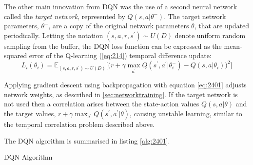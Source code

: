 The other main innovation from DQN was the use of a second neural network called the \textit{target network}, represented by $Q(s,a | \theta^-)$. The target network parameters, $\theta^-$, are a copy of the original network parameters $\theta$, that are updated periodically. Letting the notation $(s,a,r,s^\prime) \sim U(D)$ denote uniform random sampling from the buffer, the DQN loss function can be expressed as the mean-squared error of the Q-learning (\ref{eq:214}) temporal difference update:
\begin{equation}
	L_i(\theta_i) = \mathbb{E}_{(s,a,r,s^\prime) \sim U(D)} \bigg[ \bigg( r + \gamma \max_{a^\prime} Q(s^\prime, a^\prime | \theta_i^-) - Q(s, a | \theta_i) \bigg)^2 \bigg] \label{eq:2401}
\end{equation}

Applying gradient descent using backpropagation with equation \ref{eq:2401} adjusts network weights, as described in \textsection \ref{sec:networktraining}. If the target network is not used then a correlation arises between the state-action values $Q(s,a | \theta)$ and the target values, $r + \gamma \max_{a^\prime} Q(s^\prime,a^\prime | \theta)$, causing unstable learning, similar to the temporal correlation problem described above.

The DQN algorithm is summarised in listing \ref{alg:2401}.

\begin{algorithm}[h]
	\caption{DQN Algorithm}
	\begin{algorithmic}[1]
			\EndFor
		\EndFor
	\end{algorithmic}\label{alg:2401}
\end{algorithm}

